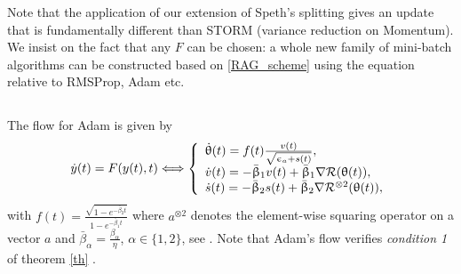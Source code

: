 \documentclass[article,authoryear,jmlmc]{beg_32}             %
\begin{document}
        Note that the application of our extension of Speth's splitting gives an update that is fundamentally different than STORM (variance reduction on Momentum). 
        We insist on the fact that any $F$ can be chosen: a whole new family of mini-batch algorithms can be constructed based on \eqref{RAG_scheme} using the
        equation relative to RMSProp, Adam etc.

\subsection{}
\label{adam}
The flow for Adam is given by \cite{barakat,Bilel,Bilel_thesis}
\begin{eqnarray}
  \label{Flow_adam}
  \dot{y}(t) = F(y(t),t) \Longleftrightarrow  \left\{\begin{array}{l}
    \dot{\theta}(t)= f(t) \frac{v(t)}{\sqrt{\epsilon_a+s(t)}},\\
    \dot{v}(t)= -\bar{\beta}_1 v(t)+\bar{\beta}_1\nR(\theta(t)),\\
    \dot{s}(t)= -\bar{\beta}_2 s(t)+\bar{\beta}_2\nR^{\otimes 2}(\theta(t)),\\
  \end{array}\right.
\end{eqnarray}
with $f(t)= \frac{\sqrt{1-e^{-\bar{\beta}_2 t}}}{1-e^{-\bar{\beta}_1 t}}$
    where $a^{\otimes 2}$  denotes the element-wise squaring operator on a vector $a$ and $\bar{\beta}_\alpha = \frac{\beta_\alpha}{\eta}$, $\alpha\in\{1,2\}$, see \cite{Bilel}.
Note that Adam's flow verifies {\em condition 1} of theorem \ref{th} \cite{Bilel}.
\end{document}
